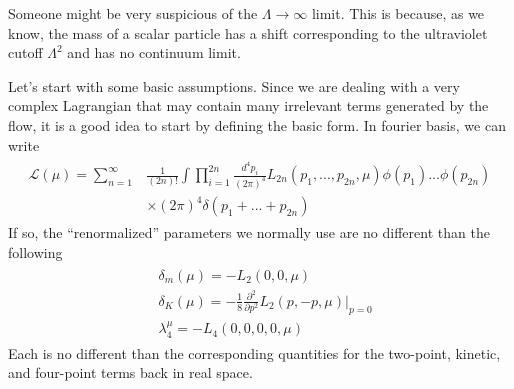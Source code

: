 \documentclass[12pt,halfline,a4paper]{ouparticle}
\begin{document}
Someone might be very suspicious of the $\Lambda\rightarrow\infty$ limit. This is because, as we know, the mass of a scalar particle has a shift corresponding to the ultraviolet cutoff $\Lambda^2$ and has no continuum limit.

Let's start with some basic assumptions. Since we are dealing with a very complex Lagrangian that may contain many irrelevant terms generated by the flow, it is a good idea to start by defining the basic form. In fourier basis, we can write
\begin{align}
	\begin{split}
		\mathcal L(\mu) = \sum^\infty_{n=1}&\frac{1}{(2n)!}\int\prod^{2n}_{i=1}\frac{d^4p_i}{(2\pi)^4}L_{2n}(p_1,...,p_{2n},\mu)\phi(p_1)...\phi(p_{2n})\\
		&\times(2\pi)^4\delta(p_1+...+p_{2n})
	\end{split}
\end{align}
If so, the “renormalized” parameters we normally use are no different than the following
\begin{align}
	\begin{split}
		&\delta_m(\mu) = -L_2(0,0,\mu)\\
		&\delta_K(\mu) = -\frac{1}{8}\frac{\partial^2}{\partial p^2}L_2(p,-p,\mu)|_{p=0}\\
		&\lambda^\mu_4 = -L_4(0,0,0,0,\mu)
	\end{split}
\end{align}
Each is no different than the corresponding quantities for the two-point, kinetic, and four-point terms back in real space.
\end{document}
